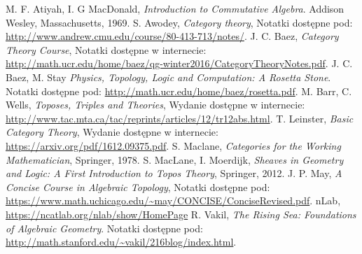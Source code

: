 \begin{thebibliography}{99}
  M. F. Atiyah, I. G MacDonald,
  \emph{Introduction to Commutative Algebra}.
  Addison Wesley, Massachusetts, 1969.
  S. Awodey,
  \emph{Category theory},
  Notatki dostępne pod: \url{http://www.andrew.cmu.edu/course/80-413-713/notes/}.
    J. C. Baez,
    \emph{Category Theory Course},
    Notatki dostępne w internecie:
    \url{http://math.ucr.edu/home/baez/qg-winter2016/CategoryTheoryNotes.pdf}.
    J. C. Baez, M. Stay
    \emph{Physics, Topology, Logic and Computation: A Rosetta Stone}.
    Notatki dostępne pod: \url{http://math.ucr.edu/home/baez/rosetta.pdf}.
  M. Barr, C. Wells,
  \emph{Toposes, Triples and Theories},
  Wydanie dostępne w internecie: \url{http://www.tac.mta.ca/tac/reprints/articles/12/tr12abs.html}.
  T. Leinster,
  \emph{Basic Category Theory},
  Wydanie dostępne w internecie: \url{https://arxiv.org/pdf/1612.09375.pdf}.
  S. Maclane,
  \emph{Categories for the Working Mathematician},
  Springer, 1978.
  S. MacLane, I. Moerdijk,
  \emph{Sheaves in Geometry and Logic: A First Introduction to Topos Theory},
  Springer, 2012.
  J. P. May,
  \emph{A Concise Course in Algebraic Topology},
  Notatki dostępne pod: \url{https://www.math.uchicago.edu/~may/CONCISE/ConciseRevised.pdf}.
  nLab,
  \url{https://ncatlab.org/nlab/show/HomePage}
    R. Vakil,
    \emph{The Rising Sea: Foundations of Algebraic Geometry}.
    Notatki dostępne pod: \url{http://math.stanford.edu/~vakil/216blog/index.html}.
\end{thebibliography}

